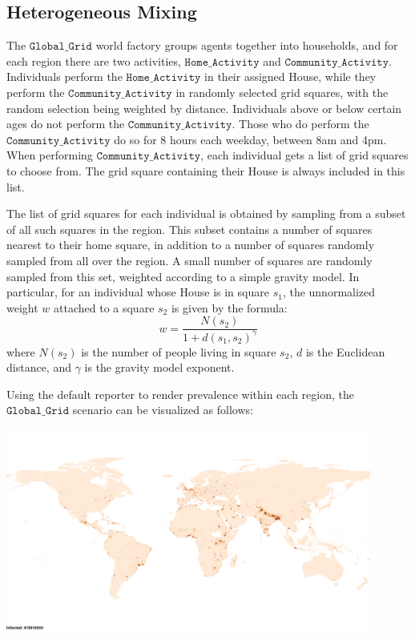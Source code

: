 \documentclass[10pt,letterpaper]{article}
\begin{document}
\subsection{Heterogeneous Mixing}

The $\texttt{Global{\_}Grid}$ world factory groups agents together into households, and for each region there are two activities, $\texttt{Home{\_}Activity}$ and $\texttt{Community{\_}Activity}$. Individuals perform the
$\texttt{Home{\_}Activity}$ in their assigned House, while they perform the $\texttt{Community{\_}Activity}$ in randomly selected grid squares, with the random selection being weighted by distance. Individuals above or below certain ages do not perform the $\texttt{Community{\_}Activity}$. Those who do perform the $\texttt{Community{\_}Activity}$ do so for 8 hours each weekday, between 8am and 4pm. When performing $\texttt{Community{\_}Activity}$, each individual gets a list of grid squares to choose from. The grid square containing their House is always included in this list.

The list of grid squares for each individual is obtained by sampling from a subset of all such squares in the region. This subset contains a number of squares nearest to their home square, in addition to a number of squares randomly sampled from all over the region. A small number of squares are randomly sampled from this set, weighted according to a simple gravity model. In particular, for an individual whose House is in square $s_1$, the unnormalized weight $w$ attached to a square $s_2$ is given by the formula:
\begin{equation}
w = \frac{N(s_2)}{1 + d(s_1, s_2)^\gamma} \nonumber
\end{equation}
where $N(s_2)$ is the number of people living in square $s_2$, $d$ is the Euclidean distance, and $\gamma$ is the gravity model exponent.

Using the default reporter to render prevalence within each region, the $\texttt{Global{\_}Grid}$ scenario can be visualized as follows:

\begin{center}
\includegraphics[width=0.9\textwidth]{heterogeneous}
\end{center}
\end{document}
